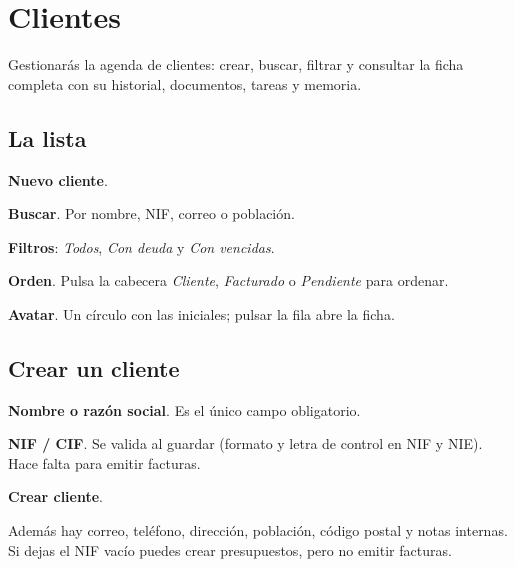 \chapter{Clientes}\label{cap:clientes}

\begin{objbox}
Gestionarás la agenda de clientes: crear, buscar, filtrar y consultar la ficha completa con su historial, documentos, tareas y memoria.
\end{objbox}

\section{La lista}
\begin{leyenda}
\item[\mk{1}] \textbf{Nuevo cliente}.
\item[\mk{2}] \textbf{Buscar}. Por nombre, NIF, correo o población.
\item[\mk{3}] \textbf{Filtros}: \emph{Todos}, \emph{Con deuda} y \emph{Con vencidas}.
\item[\mk{4}] \textbf{Orden}. Pulsa la cabecera \emph{Cliente}, \emph{Facturado} o \emph{Pendiente} para ordenar.
\item[\mk{5}] \textbf{Avatar}. Un círculo con las iniciales; pulsar la fila abre la ficha.
\end{leyenda}

\section{Crear un cliente}
\begin{leyenda}
\item[\mk{1}] \textbf{Nombre o razón social}. Es el único campo obligatorio.
\item[\mk{2}] \textbf{NIF / CIF}. Se valida al guardar (formato y letra de control en NIF y NIE). Hace falta para emitir facturas.
\item[\mk{3}] \textbf{Crear cliente}.
\end{leyenda}
Además hay correo, teléfono, dirección, población, código postal y notas internas. Si dejas el NIF vacío puedes crear presupuestos, pero no emitir facturas.

